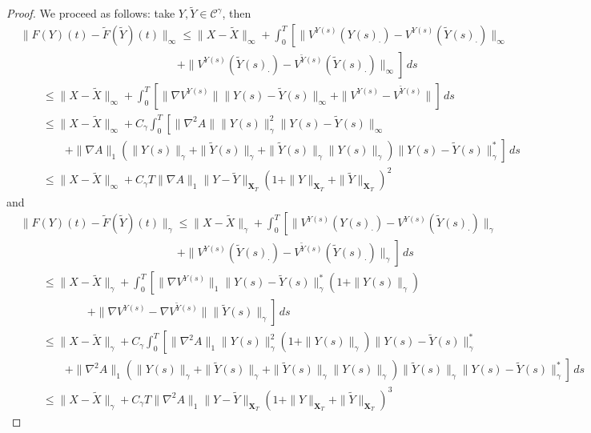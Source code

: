 \documentclass[a4paper,12pt,reqno]{amsart}
\newcommand{\wt}{\widetilde}
\newcommand{\norm}[1]{\|#1\|}
\newcommand{\CC}{\mathscr{C}}
\newcommand{\XT}{\mathbf{X}_T}
\begin{document}
\begin{proof}
We proceed as follows: take $Y,\wt Y \in \CC^\gamma$, then
\begin{equation*}
  \begin{split}
& \norm{F(Y)(t)-\wt F(\wt Y)(t)}_\infty \le \norm{X-\wt X}_\infty + \int_0^T\left[
\norm{V^{Y(s)}(Y(s)_\cdot) - V^{Y(s)}(\wt Y(s)_\cdot)}_\infty \right.
\\ & \left. \qquad \qquad \qquad  \qquad \qquad  \qquad \qquad +
\norm{V^{Y(s)}(\wt Y(s)_\cdot) - V^{\wt Y(s)}(\wt Y(s)_\cdot)}_\infty    
\right]\, ds
\\  & \qquad\le\norm{X-\wt X}_\infty + \int_0^T \left[ \norm{\nabla V^{Y(s)}} \norm{Y(s)-\wt
    Y(s)}_\infty
+ 
\norm{V^{Y(s)} - V^{\wt Y(s)}}    
\right]\, ds
\\  & \qquad\le \norm{X-\wt X}_\infty + C_\gamma \int_0^T \left[ \norm{\nabla^2
    A} \norm{Y(s)}_\gamma^2 \norm{Y(s)-\wt
    Y(s)}_\infty
\right.
\\ & \left.\qquad \qquad + 
\norm{\nabla A}_1 (\norm{Y(s)}_\gamma+\norm{\wt Y(s)}_\gamma+\norm{\wt
  Y(s)}_\gamma\norm{Y(s)}_\gamma)    \norm{Y(s)-\wt Y(s)}_\gamma^*
\right]\, ds
\\  & \qquad\le \norm{X-\wt X}_\infty +C_\gamma T \norm{\nabla A}_1 \norm{Y-\wt Y}_{\XT}
 (1+\norm{Y}_{\XT}+\norm{\wt Y}_{\XT})^2
  \end{split}
\end{equation*}
and
\begin{equation*}
  \begin{split}
& \norm{F(Y)(t)-\wt F(\wt Y)(t)}_\gamma \le \norm{X-\wt X}_\gamma + \int_0^T\left[
\norm{V^{Y(s)}(Y(s)_\cdot) - V^{Y(s)}(\wt Y(s)_\cdot)}_\gamma \right.
\\ & \left. \qquad \qquad \qquad  \qquad \qquad  \qquad \qquad +
\norm{V^{Y(s)}(\wt Y(s)_\cdot) - V^{\wt Y(s)}(\wt Y(s)_\cdot)}_\gamma    
\right]\, ds
\\  & \qquad\le  \norm{X-\wt X}_\gamma +  \int_0^T \left[ \norm{\nabla V^{Y(s)}}_1 \norm{Y(s)-\wt
    Y(s)}_\gamma^*
(1+\norm{Y(s)}_\gamma)
\right.
\\ & \left.\qquad \qquad \qquad
+ 
\norm{\nabla V^{Y(s)} - \nabla V^{\wt Y(s)}}\norm{\wt Y(s)}_\gamma    
\right]\, ds
\\  & \qquad\le \norm{X-\wt X}_\gamma +  C_\gamma \int_0^T \left[ \norm{\nabla^2
    A}_1\norm{Y(s)}_\gamma^2 (1+\norm{Y(s)}_\gamma) \norm{Y(s)-\wt
    Y(s)}_\gamma^*
\right.
\\ & \left.\qquad \qquad + 
\norm{\nabla^2 A}_1 (\norm{Y(s)}_\gamma+\norm{\wt Y(s)}_\gamma+\norm{\wt
  Y(s)}_\gamma\norm{Y(s)}_\gamma) \norm{\wt Y(s)}_\gamma    \norm{Y(s)-\wt Y(s)}_\gamma^*
\right]\, ds
\\  & \qquad\le  \norm{X-\wt X}_\gamma +  C_\gamma T \norm{\nabla^2 A}_1 \norm{Y-\wt Y}_{\XT}
 (1+\norm{Y}_{\XT}+\norm{\wt Y}_{\XT})^3
  \end{split}
\end{equation*}



\end{proof}
\end{document}
